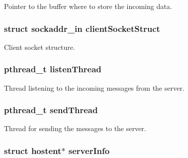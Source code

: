 Pointer to the buffer where to store the incoming data. 

\subsubsection[{\texorpdfstring{client\+Socket\+Struct}{clientSocketStruct}}]{\setlength{\rightskip}{0pt plus 5cm}struct sockaddr\+\_\+in client\+Socket\+Struct}\hypertarget{struct_s_s_c___s_t_a_t_a202412679559fc3de3606903af333031}{}\label{struct_s_s_c___s_t_a_t_a202412679559fc3de3606903af333031}


Client socket structure. 

\subsubsection[{\texorpdfstring{listen\+Thread}{listenThread}}]{\setlength{\rightskip}{0pt plus 5cm}pthread\+\_\+t listen\+Thread}\hypertarget{struct_s_s_c___s_t_a_t_a25ed3dd1e477db634fc901c587d710a7}{}\label{struct_s_s_c___s_t_a_t_a25ed3dd1e477db634fc901c587d710a7}


Thread listening to the incoming messages from the server. 

\subsubsection[{\texorpdfstring{send\+Thread}{sendThread}}]{\setlength{\rightskip}{0pt plus 5cm}pthread\+\_\+t send\+Thread}\hypertarget{struct_s_s_c___s_t_a_t_aa99c14bb21c7dc3e0f126ee818a54a2b}{}\label{struct_s_s_c___s_t_a_t_aa99c14bb21c7dc3e0f126ee818a54a2b}


Thread for sending the messages to the server. 

\subsubsection[{\texorpdfstring{server\+Info}{serverInfo}}]{\setlength{\rightskip}{0pt plus 5cm}struct hostent$\ast$ server\+Info}\hypertarget{struct_s_s_c___s_t_a_t_a5674e20ba1b0adaeb9cb149c93f755c2}{}\label{struct_s_s_c___s_t_a_t_a5674e20ba1b0adaeb9cb149c93f755c2}



